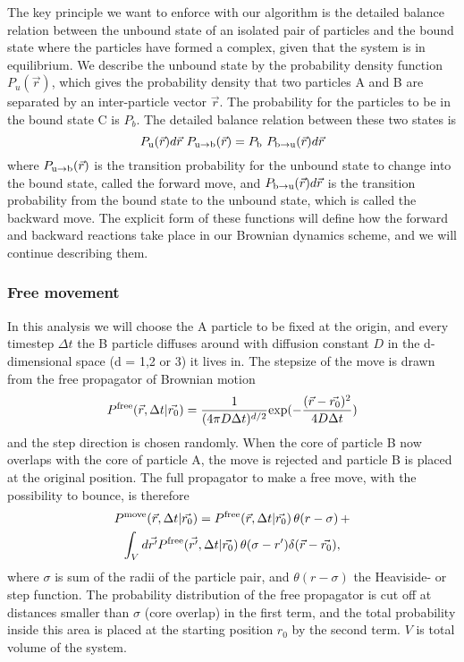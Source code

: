 The key principle we want to enforce with our algorithm is the detailed balance relation between the unbound state of an isolated pair of particles and the bound state where the particles have formed a complex, given that the system is in equilibrium. We describe the unbound state by the probability density function $P_u(\vec{r})$, which gives the probability density that two particles A and B are separated by an inter-particle vector $\vec{r}$. The probability for the particles to be in the bound state C is $P_b$. The detailed balance relation between these two states is
\begin{equation}
 P_{ \rm{u} }(\vec{r})d\vec{r} \,\, P_{ \rm{u} \to \rm{b} }(\vec{r}) = P_{ \rm{b} } \,\, P_{ \rm{b} \to \rm{u} }(\vec{r})d\vec{r}
\elabel{DBeqn}
\end{equation}
where $P_{ \rm{u} \to \rm{b} }(\vec{r})$ is the transition probability for the unbound state to change into the bound state, called the forward move, and $P_{ \rm{b} \to \rm{u}}(\vec{r})d\vec{r}$ is the transition probability from the bound state to the unbound state, which is called the backward move. The explicit form of these functions will define how the forward and backward reactions take place in our Brownian dynamics scheme, and we will continue describing them. 

\subsubsection{Free movement}
In this analysis we will choose the A particle to be fixed at the origin, and every timestep $\Delta t$ the B particle diffuses around with diffusion constant $D$ in the d-dimensional space (d = 1,2 or 3) it lives in. The stepsize of the move is drawn from the free propagator of Brownian motion 
\begin{equation}
 \elabel{BD_freeprop}
P^{\rm free}(\vec{r},\Delta t|\vec{r_0}) = \frac{1}{(4 \pi D \Delta t)^{d/2}}{\rm exp}(-\frac{(\vec{r}-\vec{r_0})^2}{4 D \Delta t}) 
\end{equation}
and the step direction is chosen randomly. When the core of particle B now overlaps with the core of particle A, the move is rejected and particle B is placed at the original position. The full propagator to make a free move, with the possibility to bounce, is therefore
\begin{multline}
 P^{\rm move}(\vec{r},\Delta t|\vec{r_0}) = P^{\rm free}(\vec{r},\Delta t|\vec{r_0}) \, \theta(r - \sigma) \, + \\ \int_{V} d\vec{r'}P^{\rm free}(\vec{r'},\Delta t|\vec{r_0}) \, \theta(\sigma - r')\delta(\vec{r}-\vec{r_0}),
\elabel{move_prop}
\end{multline}
where $\sigma$ is sum of the radii of the particle pair, and $\theta(r - \sigma)$ the Heaviside- or step function. The probability distribution of the free propagator is cut off at distances smaller than $\sigma$ (core overlap) in the first term, and the total probability inside this area is placed at the starting position $r_0$ by the second term. $V$ is total volume of the system.

